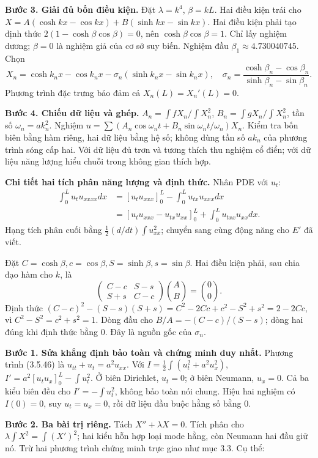 \textbf{Bước 3. Giải đủ bốn điều kiện.} Đặt $\lambda=k^4$, $\beta=kL$. Hai điều kiện trái cho $X=A(\cosh kx-\cos kx)+B(\sinh kx-\sin kx)$. Hai điều kiện phải tạo định thức $2(1-\cosh\beta\cos\beta)=0$, nên $\cosh\beta\cos\beta=1$. Chỉ lấy nghiệm dương; $\beta=0$ là nghiệm giả của cơ sở suy biến. Nghiệm đầu $\beta_1\approx4.730040745$. Chọn
\[X_n=\cosh k_nx-\cos k_nx-\sigma_n(\sinh k_nx-\sin k_nx),\quad
\sigma_n=\frac{\cosh\beta_n-\cos\beta_n}{\sinh\beta_n-\sin\beta_n}.\]
Phương trình đặc trưng bảo đảm cả $X_n(L)=X_n'(L)=0$.

\textbf{Bước 4. Chiếu dữ liệu và ghép.} $A_n=\int fX_n/\int X_n^2$, $B_n=\int gX_n/\int X_n^2$, tần số $\omega_n=ak_n^2$. Nghiệm $u=\sum(A_n\cos\omega_nt+B_n\sin\omega_nt/\omega_n)X_n$. Kiểm tra bốn biên bằng hàm riêng, hai dữ liệu bằng hệ số; không dùng tần số $ak_n$ của phương trình sóng cấp hai. Với dữ liệu đủ trơn và tương thích thu nghiệm cổ điển; với dữ liệu năng lượng hiểu chuỗi trong không gian thích hợp.

\textbf{Chi tiết hai tích phân năng lượng và định thức.} Nhân PDE với $u_t$:
\[\begin{aligned}
\int_0^Lu_tu_{xxxx}dx
&=[u_tu_{xxx}]_0^L-\int_0^Lu_{tx}u_{xxx}dx\\
&=[u_tu_{xxx}-u_{tx}u_{xx}]_0^L+\int_0^Lu_{txx}u_{xx}dx.
\end{aligned}\]
Hạng tích phân cuối bằng $\frac12(d/dt)\int u_{xx}^2$; chuyển sang cùng động năng cho $E'$ đã viết.

Đặt $C=\cosh\beta,c=\cos\beta,S=\sinh\beta,s=\sin\beta$. Hai điều kiện phải, sau chia đạo hàm cho $k$, là
\[\begin{pmatrix}C-c&S-s\\S+s&C-c\end{pmatrix}\binom AB=\binom00.\]
Định thức $(C-c)^2-(S-s)(S+s)=C^2-2Cc+c^2-S^2+s^2=2-2Cc$, vì $C^2-S^2=c^2+s^2=1$. Dòng đầu cho $B/A=-(C-c)/(S-s)$; dòng hai đúng khi định thức bằng $0$. Đây là nguồn gốc của $\sigma_n$.

\textbf{Bước 1. Sửa khẳng định bảo toàn và chứng minh duy nhất.} Phương trình (3.5.46) là $u_{tt}+u_t=a^2u_{xx}$. Với $I=\frac12\int(u_t^2+a^2u_x^2)$, $I'=a^2[u_tu_x]_0^L-\int u_t^2$. Ở biên Dirichlet, $u_t=0$; ở biên Neumann, $u_x=0$. Cả ba kiểu biên đều cho $I'=-\int u_t^2$, không bảo toàn nói chung. Hiệu hai nghiệm có $I(0)=0$, suy $u_t=u_x=0$, rồi dữ liệu đầu buộc hằng số bằng $0$.

\textbf{Bước 2. Ba bài trị riêng.} Tách $X''+\lambda X=0$. Tích phân cho $\lambda\int X^2=\int(X')^2$; hai kiểu hỗn hợp loại mode hằng, còn Neumann hai đầu giữ nó. Trừ hai phương trình chứng minh trực giao như mục 3.3. Cụ thể:


